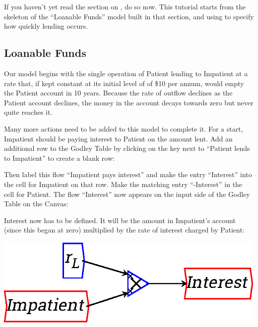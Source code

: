 If you haven't yet read the section on , do so now. This tutorial starts from the
skeleton of the ``Loanable Funds'' model built in that section, and
using  to specify how quickly
lending occurs.  


\subsection{Loanable Funds}

Our model begins with the single operation of Patient lending to
Impatient at a rate that, if kept constant at its initial level of of
\$10 per annum, would empty the Patient account in 10 years. Because
the rate of outflow declines as the Patient account declines, the
money in the account decays towards zero but never quite reaches it.


Many more actions need to be added to this model to complete it. For a
start, Impatient should be paying interest to Patient on the amount
lent. Add an additional row to the Godley Table by clicking on the
 key
next to ``Patient lends to Impatient'' to create a blank row:


Then label this flow ``Impatient pays interest'' and make the entry
``Interest'' into the cell for Impatient on that row. Make the matching
entry ``-Interest'' in the cell for Patient. The flow ``Interest'' now
appears on the input side of the Godley Table on the Canvas: 


Interest now has to be defined. It will be the amount in Impatient's
account (since this began at zero) multiplied by the rate of interest
charged by Patient:

\begin{center}
\includegraphics{images/NewItem173.eps}
\end{center}

